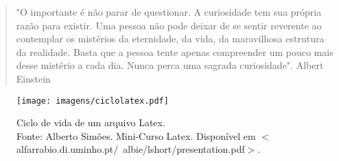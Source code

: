 

\begin{flushright}
\begin{minipage}{0.8\textwidth} %
\begin{quote}
\singlespacing %
"O importante é não parar de questionar. A curiosidade tem sua própria razão para existir. Uma pessoa não pode deixar de se sentir reverente ao contemplar os mistérios da eternidade, da vida, da maravilhosa estrutura da realidade. Basta que a pessoa tente apenas compreender um pouco mais desse mistério a cada dia.
Nunca perca uma sagrada curiosidade". Albert Einstein
\end{quote}
\end{minipage}
\end{flushright}



\begin{figure}[!h]
\centering
\texttt{[image: imagens/ciclolatex.pdf]} %
\caption{Ciclo de vida de um arquivo Latex. \\\hspace{\textwidth}Fonte: Alberto Simões. Mini-Curso Latex. Disponível em $<$alfarrabio.di.uminho.pt/~albie/lshort/presentation.pdf$>$.} %
\label{ciclo}

\end{figure}